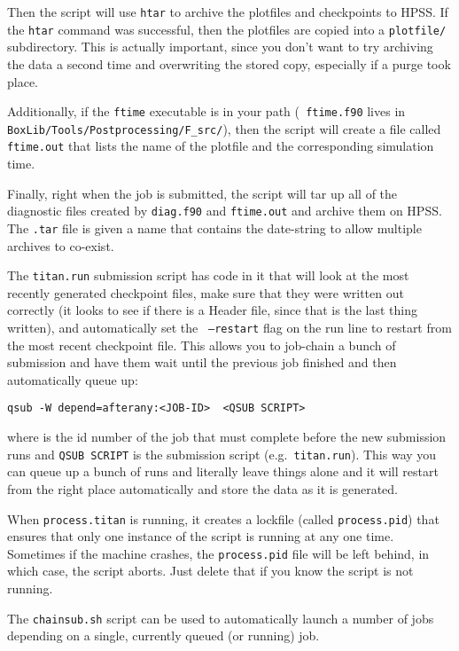 Then the script will use {\tt htar} to archive the plotfiles and
checkpoints to HPSS.  If the {\tt htar} command was successful, then
the plotfiles are copied into a {\tt plotfile/} subdirectory.  This is
actually important, since you don't want to try archiving the data a
second time and overwriting the stored copy, especially if a purge
took place.

Additionally, if the {\tt ftime} executable is in your path ({\tt
ftime.f90} lives in {\tt BoxLib/Tools/Postprocessing/F\_src/}), then
the script will create a file called {\tt ftime.out} that lists the
name of the plotfile and the corresponding simulation time.

Finally, right when the job is submitted, the script will tar up all
of the diagnostic files created by {\tt diag.f90} and {\tt ftime.out}
and archive them on HPSS.  The {\tt .tar} file is given a name that
contains the date-string to allow multiple archives to co-exist.

The {\tt titan.run} submission script has code in it that will look at
the most recently generated checkpoint files, make sure that they were
written out correctly (it looks to see if there is a Header file,
since that is the last thing written), and automatically set the {\tt
--restart} flag on the run line to restart from the most recent
checkpoint file.  This allows you to job-chain a bunch of submission
and have them wait until the previous job finished and then
automatically queue up:
\begin{verbatim}
qsub -W depend=afterany:<JOB-ID>  <QSUB SCRIPT>
\end{verbatim}
where {\tt <JOB-ID>} is the id number of the job that must complete
before the new submission runs and {\tt QSUB SCRIPT} is the submission
script (e.g.\ {\tt titan.run}).  This way you can queue up a bunch of
runs and literally leave things alone and it will restart from the
right place automatically and store the data as it is generated.

When {\tt process.titan} is running, it creates a lockfile (called
{\tt process.pid}) that ensures that only one instance of the script
is running at any one time.  Sometimes if the machine crashes, the
{\tt process.pid} file will be left behind, in which case, the script
aborts.  Just delete that if you know the script is not running.

The {\tt chainsub.sh} script can be used to automatically launch a
number of jobs depending on a single, currently queued (or running)
job.


